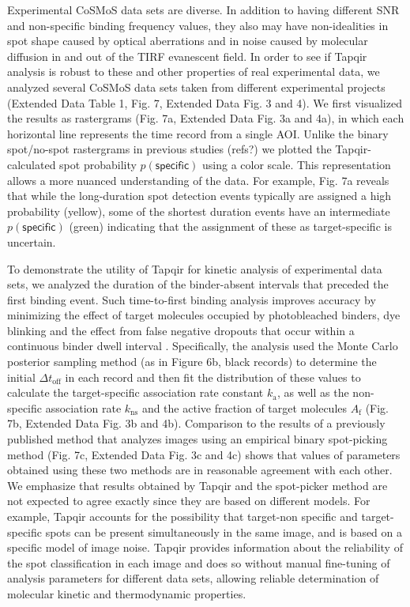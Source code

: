 Experimental CoSMoS data sets are diverse.  In addition to having different SNR and non-specific binding frequency values, they also may have non-idealities in spot shape caused by optical aberrations and in noise caused by molecular diffusion in and out of the TIRF evanescent field.  In order to see if Tapqir analysis is robust to these and other properties of real experimental data, we  analyzed several CoSMoS data sets taken from different experimental projects (Extended Data Table 1, Fig. 7, Extended Data Fig. 3 and 4). We first visualized the results as rastergrams (Fig. 7a, Extended Data Fig. 3a and 4a), in which each horizontal line represents the time record from a single AOI.  Unlike the binary spot/no-spot rastergrams in previous studies (refs?) we plotted the Tapqir-calculated spot probability $p(\mathsf{specific})$ using a color scale.  This representation allows a more nuanced understanding of the data.  For example, Fig. 7a reveals that while the long-duration spot detection events typically are assigned a high probability (yellow), some of the shortest duration events have an intermediate $p(\mathsf{specific})$ (green) indicating that the assignment of these as target-specific is uncertain.  

To demonstrate the utility of Tapqir for kinetic analysis of experimental data sets, we analyzed the duration of the binder-absent intervals that preceded the first binding event.  Such time-to-first binding analysis improves accuracy by minimizing the effect of target molecules occupied by photobleached binders, dye blinking and the effect from false negative dropouts that occur within a continuous binder dwell interval \cite{Friedman2006-kb}.  Specifically, the analysis used the Monte Carlo posterior sampling method (as in Figure 6b, black records) to determine the initial  $\Delta t_\mathrm{off}$ in each record and then fit the distribution of these values to calculate the target-specific association rate constant $k_\mathrm{a}$, as well as the non-specific association rate $k_\mathrm{ns}$ and the active fraction of target molecules $A_\mathrm{f}$ (Fig. 7b, Extended Data Fig. 3b and 4b). Comparison to the results of a previously published method that analyzes images using an empirical binary spot-picking method \cite{Friedman2006-kb} (Fig. 7c, Extended Data Fig. 3c and 4c) shows that values of parameters obtained using these two methods are in reasonable agreement with each other. We emphasize that results obtained by Tapqir and the spot-picker method are not expected to agree exactly since they are based on different models.  For example, Tapqir accounts for the possibility that target-non specific and target-specific spots can be present simultaneously in the same image, and is based on a specific model of image noise.  Tapqir provides information about the reliability of the spot classification in each image and does so without manual fine-tuning of analysis parameters for different data sets, allowing reliable determination of molecular kinetic and thermodynamic properties.

